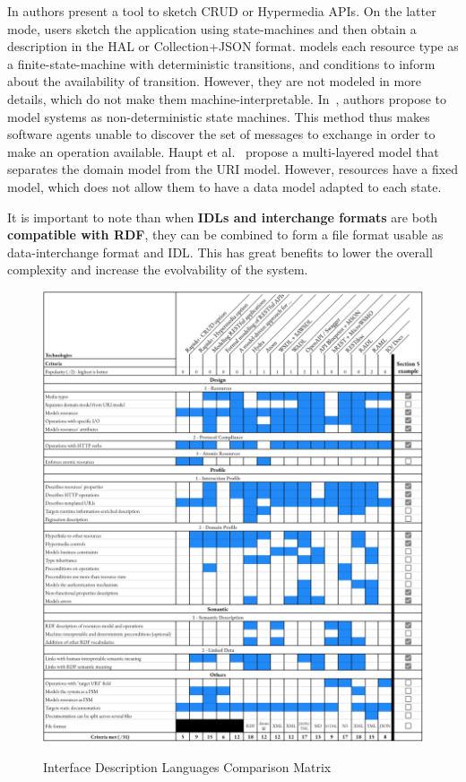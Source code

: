 In \cite{Rapido} authors present a tool to sketch CRUD or Hypermedia APIs. On the latter mode, users sketch the application using state-machines and then obtain a description in the HAL or Collection+JSON format.
\cite{Schreier:2011:MRA:1967428.1967434} models each resource type as a finite-state-machine with deterministic transitions, and conditions to inform about the availability of transition. However, they are not modeled in more details, which do not make them machine-interpretable.
In~\cite{10.1007/978-3-642-22233-7_24}, authors propose to model systems as non-deterministic state machines. This method thus makes software agents unable to discover the set of messages to exchange in order to make an operation available.
Haupt et al.~\cite{10.1109/ICWS.2014.30} propose a multi-layered model that separates the domain model from the URI model. However, resources have a fixed model, which does not allow them to have a data model adapted to each state.

It is important to note than when \textbf{IDLs and interchange formats} are both \textbf{compatible with RDF}, they can be combined to form a file format usable as data-interchange format and IDL. This has great benefits to lower the overall complexity and increase the evolvability of the system.

\begin{figure}[!ht]
\caption{Interface Description Languages Comparison Matrix}
\includegraphics[width=1\textwidth]{figures/IDL.png}
\label{idl-matrix}
\vspace{-1.5cm}
\end{figure}

